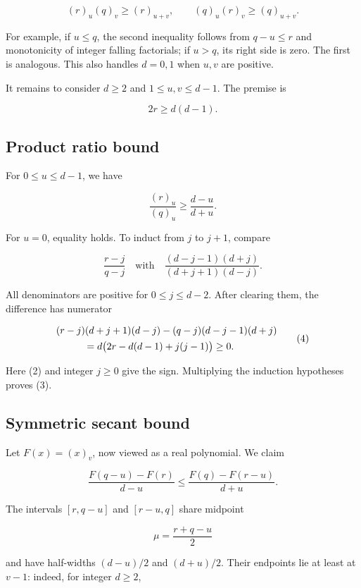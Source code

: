\[
(r)_u(q)_v\ge (r)_{u+v},\qquad (q)_u(r)_v\ge(q)_{u+v}.
\]

For example, if \(u\le q\), the second inequality follows from \(q-u\le r\) and monotonicity of integer falling factorials; if \(u>q\), its right side is zero. The first is analogous. This also handles \(d=0,1\) when \(u,v\) are positive.

It remains to consider \(d\ge 2\) and \(1\le u,v\le d-1\). The premise is

\[
2r\ge d(d-1).\tag{2}
\]

\subsection{Product ratio bound}\label{product-ratio-bound}

For \(0\le u\le d-1\), we have

\[
\frac{(r)_u}{(q)_u}\ge\frac{d-u}{d+u}.\tag{3}
\]

For \(u=0\), equality holds. To induct from \(j\) to \(j+1\), compare

\[
\frac{r-j}{q-j}
\quad\text{with}\quad
\frac{(d-j-1)(d+j)}{(d+j+1)(d-j)}.
\]

All denominators are positive for \(0\le j\le d-2\). After clearing them, the difference has numerator

\[
\begin{aligned}
&(r-j)(d+j+1)(d-j)-(q-j)(d-j-1)(d+j)\\
&\hspace{10mm}=d\bigl(2r-d(d-1)+j(j-1)\bigr)\ge0.
\end{aligned}\tag{4}
\]

Here (2) and integer \(j\ge 0\) give the sign. Multiplying the induction hypotheses proves (3).

\subsection{Symmetric secant bound}\label{symmetric-secant-bound}

Let \(F(x)=(x)_v\), now viewed as a real polynomial. We claim

\[
\frac{F(q-u)-F(r)}{d-u}
\le
\frac{F(q)-F(r-u)}{d+u}.\tag{5}
\]

The intervals \([r,q-u]\) and \([r-u,q]\) share midpoint

\[
\mu=\frac{r+q-u}{2}
\]

and have half-widths \((d-u)/2\) and \((d+u)/2\). Their endpoints lie at least at \(v-1\): indeed, for integer \(d\ge 2\),

